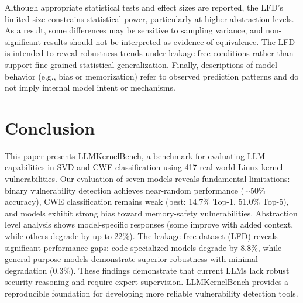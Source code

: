 \documentclass[lettersize,journal]{IEEEtran}
\begin{document}
Although appropriate statistical tests and effect sizes are reported, the LFD's limited size constrains statistical power, particularly at higher abstraction levels. As a result, some differences may be sensitive to sampling variance, and non-significant results should not be interpreted as evidence of equivalence. The LFD is intended to reveal robustness trends under leakage-free conditions rather than support fine-grained statistical generalization. Finally, descriptions of model behavior (e.g., bias or memorization) refer to observed prediction patterns and do not imply internal model intent or mechanisms.

\section{Conclusion}
\label{section:conclusion}

This paper presents LLMKernelBench, a benchmark for evaluating \gls{LLM} capabilities in \gls{SVD} and CWE classification using 417 real-world Linux kernel vulnerabilities. Our evaluation of seven models reveals fundamental limitations: binary vulnerability detection achieves near-random performance ($\sim$50\% accuracy), CWE classification remains weak (best: 14.7\% Top-1, 51.0\% Top-5), and models exhibit strong bias toward memory-safety vulnerabilities. Abstraction level analysis shows model-specific responses (some improve with added context, while others degrade by up to 22\%). The leakage-free dataset (LFD) reveals significant performance gaps: code-specialized models degrade by 8.8\%, while general-purpose models demonstrate superior robustness with minimal degradation (0.3\%). These findings demonstrate that current \glspl{LLM} lack robust security reasoning and require expert supervision. LLMKernelBench provides a reproducible foundation for developing more reliable vulnerability detection tools.





\end{document}

